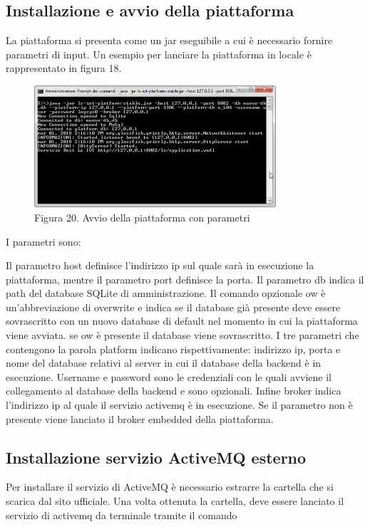 \subsection{Installazione e avvio della piattaforma}
La piattaforma si presenta come un jar eseguibile a cui è necessario fornire parametri di input. Un esempio per lanciare la piattaforma in locale è rappresentato in figura 18.
\begin{figure}[h]
			\centering
			\includegraphics[width=0.8\textwidth]{lancio-piattaforma.png}
			\caption*{Figura 20. Avvio della piattaforma con parametri}
\end{figure}

I parametri sono:
{\selectfont
	
}
Il parametro host definisce l'indirizzo ip sul quale sarà in esecuzione la piattaforma, mentre il parametro port definisce la porta.
Il parametro db indica il path del database SQLite di amministrazione. Il comando opzionale ow è un'abbreviazione di overwrite e indica se il database già presente deve essere sovrascritto con un nuovo database di default nel momento in cui la piattaforma viene avviata. se ow è presente il database viene sovrascritto.
I tre parametri che contengono la parola platform indicano rispettivamente: indirizzo ip, porta e nome del database relativi al server in cui il database della backend è in esecuzione.
Username e password sono le credenziali con le quali avviene il collegamento al database della backend e sono opzionali. Infine broker indica l'indirizzo ip al quale il servizio activemq è in esecuzione. Se il parametro non è presente viene lanciato il broker embedded della piattaforma.
\clearpage
\subsection{Installazione servizio ActiveMQ esterno}
Per installare il servizio di ActiveMQ è necessario estrarre la cartella che si scarica dal sito ufficiale. Una volta ottenuta la cartella, deve essere lanciato il servizio di activemq da terminale tramite il comando 

